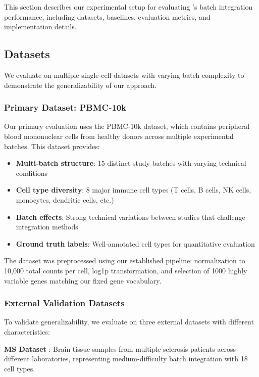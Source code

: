 This section describes our experimental setup for evaluating \bioformer{}'s batch integration performance, including datasets, baselines, evaluation metrics, and implementation details.

\subsection{Datasets}

We evaluate \bioformer{} on multiple single-cell datasets with varying batch complexity to demonstrate the generalizability of our approach.

\subsubsection{Primary Dataset: PBMC-10k}

Our primary evaluation uses the PBMC-10k dataset, which contains peripheral blood mononuclear cells from healthy donors across multiple experimental batches. This dataset provides:

\begin{itemize}
\item \textbf{Multi-batch structure}: 15 distinct study batches with varying technical conditions
\item \textbf{Cell type diversity}: 8 major immune cell types (T cells, B cells, NK cells, monocytes, dendritic cells, etc.)
\item \textbf{Batch effects}: Strong technical variations between studies that challenge integration methods
\item \textbf{Ground truth labels}: Well-annotated cell types for quantitative evaluation
\end{itemize}

The dataset was preprocessed using our established pipeline: normalization to 10,000 total counts per cell, log1p transformation, and selection of 1000 highly variable genes matching our fixed gene vocabulary.

\subsubsection{External Validation Datasets}

To validate generalizability, we evaluate on three external datasets with different characteristics:

\textbf{MS Dataset} \citep{ms2023}: Brain tissue samples from multiple sclerosis patients across different laboratories, representing medium-difficulty batch integration with 18 cell types.

